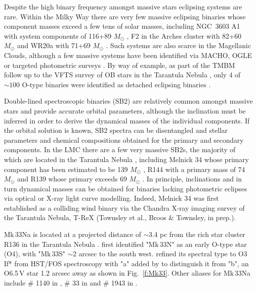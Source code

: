 \documentclass[fleqn,usenatbib]{mnras}
\begin{document}
Despite the high binary frequency  amongst massive stars \citep{sana2012Sci, sana2013} eclipsing systems are rare.  Within the Milky Way there are very few massive eclipsing binaries whose component masses exceed a few tens of solar masses, including NGC~3603 A1 with system components of 116+89 $M_{\odot}$ \citep{schnurr2008}, F2 in the Arches cluster with 82+60 $M_{\odot}$ \citep{lohr2018} and WR20a with 71+69 $M_{\odot}$ \citep{bonanos2004}. Such systems are also scarce in the Magellanic Clouds, although a few massive systems have been identified via MACHO, OGLE or targeted photometric surveys \citep[e.g.][]{massey2002, ostrov2003, bonanos2009}.  By way of example, as part of the TMBM \citep{almeida2017} follow up to the VFTS survey of OB stars in the Tarantula Nebula \citep{evans2011}, only 4 of $\sim 100$ O-type binaries were identified as detached eclipsing binaries \citep{mahy2020}.



Double-lined spectroscopic binaries (SB2) are relatively common amongst massive stars and provide accurate orbital parameters, although the inclination must be inferred in order to derive the dynamical masses of the individual components. If the orbital solution is known, SB2 spectra can be disentangled and stellar parameters and chemical compositions obtained for the primary and secondary components. In the LMC there are a few very massive SB2s, the majority of which are located in the Tarantula Nebula \citep{crowther2019}, including Melnick 34 whose primary component has been estimated to be 139 $M_{\odot}$ \citep{tehrani2019}, R144 with a primary mass of 74 $M_{\odot}$ \citep{shenar2021} and  R139 whose primary exceeds 69 $M_{\odot}$ \citep{mahy2020}. In principle, inclinations  and in turn dynamical masses can be obtained for binaries lacking photometric eclipses via optical  \citep[e.g.][]{shenar2021} or X-ray light curve modelling. Indeed, Melnick 34 \citep{pollock2018} was first established as a colliding wind binary via the Chandra X-ray imaging survey of the Tarantula Nebula, T-ReX (Townsley et al., Broos \& Townsley, in prep.).

Mk\,33Na is located at a projected distance of $\sim$3.4 pc from the rich star cluster R136 in the Tarantula Nebula \citep{massey1998, crowther1998}. \cite{melnick1985} first identified "Mk\,33N" as an early O-type star (O4), with "Mk\,33S" $\sim$2 arcsec to the south west. \cite{massey1998} refined its spectral type to O3\,If* from HST/FOS spectroscopy \citep[alias \# 16 from][]{hunter1995} with "a" added by \cite{crowther1998} to distinguish it from "b", an O6.5\,V star \citep[alias \# 32 from][]{hunter1995} 1.2 arcsec away as shown in Fig.~\ref{f:Mk33}. Other aliases for Mk\,33Na include \# 1140 in \cite{parker1993}, \# 33 in \cite{selman1999a} and \# 1943 in \cite{castro2018}. 
\end{document}
